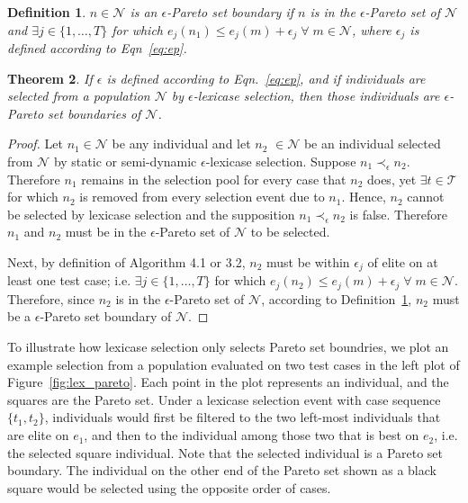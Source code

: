 \documentclass[twoside]{article}
\newtheorem{lex}{Theorem}[section]
\newtheorem{defn}[lex]{Definition}
\begin{document}
\begin{defn}\label{def:eboundary}
$n \in \mathcal{N}$ is an {\it $\epsilon$-Pareto set boundary} if $n$ is in the $\epsilon$-Pareto set of $\mathcal{N}$ and $\exists j \in \{1,\dots,T\}$ for which $e_j(n_1) \leq e_j(m) + \epsilon_j \; \forall \; m \in \mathcal{N}$, where $\epsilon_j$ is defined according to Eqn~\ref{eq:ep}. \bigskip
\end{defn}

\begin{lex}\label{thm:eplex}
If $\epsilon$ is defined according to Eqn.~\ref{eq:ep}, and if individuals are selected from a population $\mathcal{N}$ by $\epsilon$-lexicase selection, then those individuals are $\epsilon$-Pareto set boundaries of $\mathcal{N}$.  
\end{lex}


\begin{proof}
Let $n_1 \in \mathcal{N}$ be any individual and let $n_2$ $\in \mathcal{N}$ be an individual selected from $\mathcal{N}$ by static or semi-dynamic $\epsilon$-lexicase selection. Suppose $n_1 \prec_{\epsilon} n_2$. Therefore $n_1$ remains in the selection pool for every case that $n_2$ does, yet $\exists t \in \mathcal{T}$ for which $n_2$ is removed from every selection event due to $n_1$. Hence, $n_2$ cannot be selected by lexicase selection and the supposition $n_1 \prec_{\epsilon} n_2$ is false.  Therefore $n_1$ and $n_2$ must be in the $\epsilon$-Pareto set of $\mathcal{N}$ to be selected. 

Next, by definition of Algorithm 4.1 or 3.2, $n_2$ must be within $\epsilon_j$ of elite on at least one test case; i.e. $\exists j \in \{1,\dots,T\}$ for which $e_j(n_2) \leq e_j(m) + \epsilon_j \; \forall \; m \in \mathcal{N}$. Therefore, since $n_2$ is in the $\epsilon$-Pareto set of $\mathcal{N}$, according to Definition~\ref{def:eboundary}, $n_2$ must be a $\epsilon$-Pareto set boundary of $\mathcal{N}$.  
\end{proof}
\bigskip

To illustrate how lexicase selection only selects Pareto set boundries, we plot an example selection from a population evaluated on two test cases in the left plot of Figure~\ref{fig:lex_pareto}. Each point in the plot represents an individual, and the squares are the Pareto set. Under a lexicase selection event with case sequence $\{t_1, t_2\}$, individuals would first be filtered to the two left-most individuals that are elite on $e_1$, and then to the individual among those two that is best on $e_2$, i.e. the selected square individual. Note that the selected individual is a Pareto set boundary. The individual on the other end of the Pareto set shown as a black square would be selected using the opposite order of cases.  
\end{document}
